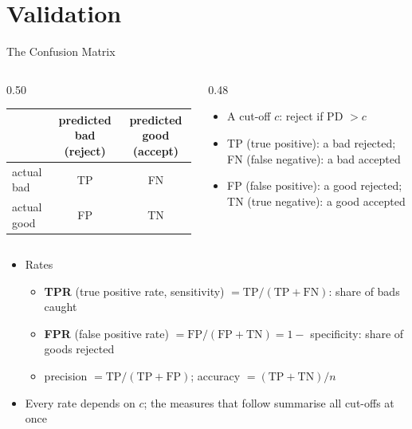 \section{Validation}

\begin{frame}{The Confusion Matrix}
\itemsize{\footnotesize}
\begin{columns}[T]
\begin{column}{0.50\textwidth}
\begin{center}
\scriptsize
\begin{tabular}{lcc}
\toprule
& predicted bad (reject) & predicted good (accept) \\
\midrule
actual bad & TP & FN \\
actual good & FP & TN \\
\bottomrule
\end{tabular}
\end{center}

\end{column}
\begin{column}{0.48\textwidth}
\begin{itemize}
    \item A cut-off $c$: reject if PD $> c$
    \item TP (true positive): a bad rejected; FN (false negative): a bad accepted
    \item FP (false positive): a good rejected; TN (true negative): a good accepted
\end{itemize}
\end{column}
\end{columns}\begin{itemize}
    \item Rates
    \begin{itemize}
        \item \textbf{TPR} (true positive rate, sensitivity) $= \mathrm{TP}/(\mathrm{TP} + \mathrm{FN})$: share of bads caught
        \item \textbf{FPR} (false positive rate) $= \mathrm{FP}/(\mathrm{FP} + \mathrm{TN}) = 1 -$ specificity: share of goods rejected
        \item precision $= \mathrm{TP}/(\mathrm{TP} + \mathrm{FP})$; accuracy $= (\mathrm{TP} + \mathrm{TN})/n$
    \end{itemize}
    \item Every rate depends on $c$; the measures that follow summarise all cut-offs at once
\end{itemize}
\end{frame}

